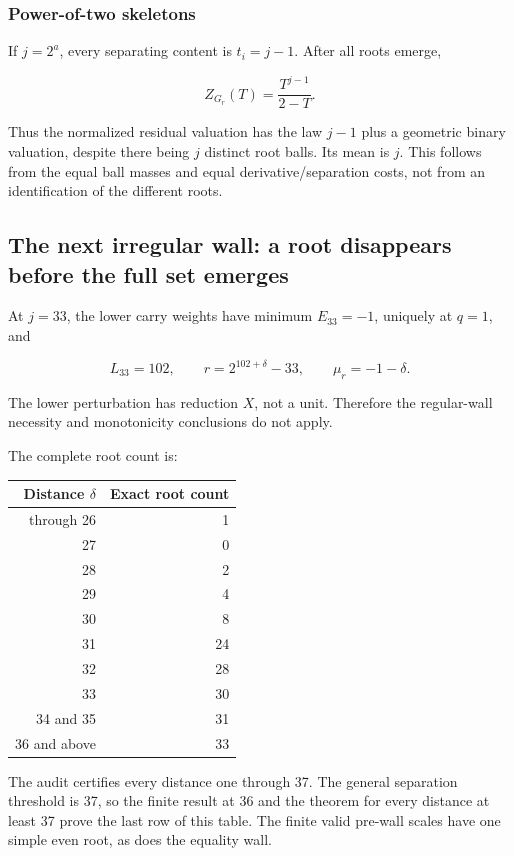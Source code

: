 \documentclass[11pt,letterpaper]{article}
\begin{document}
\subsubsection{Power-of-two skeletons}\label{power-of-two-skeletons}

If \(j=2^a\), every separating content is \(t_i=j-1\). After all roots emerge,

\[
\boxed{
Z_{G_r}(T)=\frac{T^{j-1}}{2-T}.
} \tag{V.14}
\]

Thus the normalized residual valuation has the law \(j-1\) plus a geometric binary valuation, despite there being \(j\) distinct root balls. Its mean is \(j\). This follows from the equal ball masses and equal derivative/separation costs, not from an identification of the different roots.

\subsection{The next irregular wall: a root disappears before the full set emerges}\label{the-next-irregular-wall-a-root-disappears-before-the-full-set-emerges}

At \(j=33\), the lower carry weights have minimum \(E_{33}=-1\), uniquely at \(q=1\), and

\[
L_{33}=102,\qquad r=2^{102+\delta}-33,\qquad\mu_r=-1-\delta.
\]

The lower perturbation has reduction \(X\), not a unit. Therefore the regular-wall necessity and monotonicity conclusions do not apply.

The complete root count is:

\begin{longtable}[]{@{}rr@{}}
\toprule\noalign{}
Distance \(\delta\) & Exact root count \\
\midrule\noalign{}
\endhead
\bottomrule\noalign{}
\endlastfoot
1 through 26 & 1 \\
27 & 0 \\
28 & 2 \\
29 & 4 \\
30 & 8 \\
31 & 24 \\
32 & 28 \\
33 & 30 \\
34 and 35 & 31 \\
36 and above & 33 \\
\end{longtable}

The audit certifies every distance one through 37. The general separation threshold is 37, so the finite result at 36 and the theorem for every distance at least 37 prove the last row of this table. The finite valid pre-wall scales have one simple even root, as does the equality wall.
\end{document}
